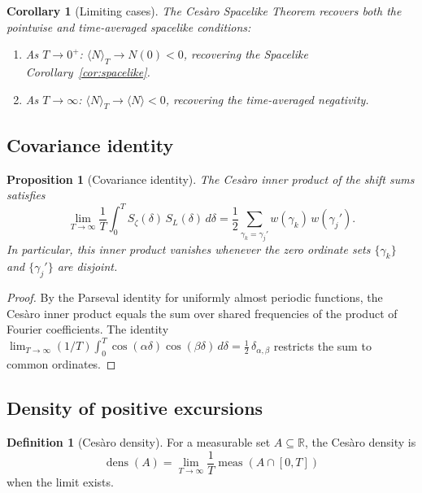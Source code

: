 \documentclass[12pt,reqno]{amsart}
\theoremstyle{plain}
\newtheorem{proposition}[theorem]{Proposition}
\newtheorem{corollary}[theorem]{Corollary}
\theoremstyle{definition}
\newtheorem{definition}[theorem]{Definition}
\theoremstyle{remark}
\DeclareMathOperator{\dens}{dens}
\newcommand{\R}{\mathbb{R}}
\newcommand{\half}{\tfrac{1}{2}}
\begin{document}
\begin{corollary}[Limiting cases]\label{cor:cesaro-limits}
The Ces\`aro Spacelike Theorem recovers both the pointwise and time-averaged spacelike conditions:
\begin{enumerate}[label=\textup{(\alph*)}]
\item As $T \to 0^+$: $\langle N \rangle_T \to N(0) < 0$, recovering the Spacelike Corollary~\ref{cor:spacelike}.
\item As $T \to \infty$: $\langle N \rangle_T \to \langle N \rangle < 0$, recovering the time-averaged negativity.
\end{enumerate}
\end{corollary}

\subsection{Covariance identity}

\begin{proposition}[Covariance identity]\label{prop:covariance}
The Ces\`aro inner product of the shift sums satisfies
\[
\lim_{T \to \infty} \frac{1}{T}\int_0^T S_\zeta(\delta)\,S_{L}(\delta)\,d\delta
= \frac{1}{2}\sum_{\gamma_k = \gamma_j'} w(\gamma_k)\,w(\gamma_j').
\]
In particular, this inner product vanishes whenever the zero ordinate sets $\{\gamma_k\}$ and $\{\gamma_j'\}$ are disjoint.
\end{proposition}

\begin{proof}
By the Parseval identity for uniformly almost periodic functions, the Ces\`aro inner product equals the sum over shared frequencies of the product of Fourier coefficients. The identity $\lim_{T \to \infty}(1/T)\int_0^T \cos(\alpha\delta)\cos(\beta\delta)\,d\delta = \half\,\delta_{\alpha,\beta}$ restricts the sum to common ordinates.
\end{proof}

\subsection{Density of positive excursions}

\begin{definition}[Ces\`aro density]\label{def:cesaro-density}
For a measurable set $A \subseteq \R$, the Ces\`aro density is
\[
\dens(A) = \lim_{T \to \infty} \frac{1}{T} \operatorname{meas}(A \cap [0, T])
\]
when the limit exists.
\end{definition}
\end{document}
